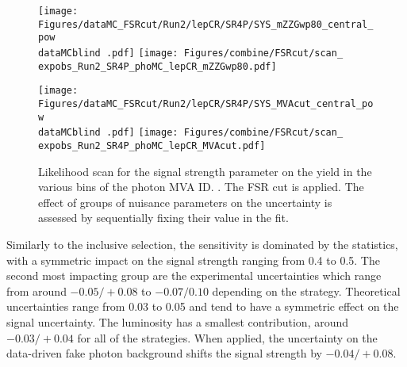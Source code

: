 \begin{figure}
  \texttt{[image: Figures/dataMC\_FSRcut/Run2/lepCR/SR4P/SYS\_mZZGwp80\_central\_pow\\dataMCblind .pdf]}
  \hfill
  \centering
  \texttt{[image: Figures/combine/FSRcut/scan\_\\expobs\_Run2\_SR4P\_phoMC\_lepCR\_mZZGwp80.pdf]}
  \caption{}
  \label{fig:scan_FSRcut_Run2_SR4P_phoMC_lepCR_mZZGwp80}
\end{figure}

\begin{figure}
  \centering
  \texttt{[image: Figures/dataMC\_FSRcut/Run2/lepCR/SR4P/SYS\_MVAcut\_central\_pow\\dataMCblind .pdf]}
  \hfill
  \texttt{[image: Figures/combine/FSRcut/scan\_\\expobs\_Run2\_SR4P\_phoMC\_lepCR\_MVAcut.pdf]}
  \caption{Likelihood scan for the signal strength parameter
    on the yield in the various bins of the photon MVA ID.
    .
    The FSR cut is applied.
    The effect of groups of nuisance parameters on the uncertainty is assessed by sequentially fixing their value in the fit.
  }
  \label{fig:scan_FSRcut_Run2_SR4P_phoMC_lepCR_MVAcut}
\end{figure}

Similarly to the inclusive selection, the sensitivity is dominated by the statistics,
with a symmetric impact on the signal strength ranging from 0.4 to 0.5.
The second most impacting group are the experimental uncertainties
which range from around $-0.05/+0.08$ to $-0.07/0.10$ depending on the strategy.
Theoretical uncertainties range from 0.03 to 0.05 and tend to have a symmetric effect on the signal uncertainty.
The luminosity has a smallest contribution, around $-0.03/+0.04$ for all of the strategies.
When applied, the uncertainty on the data-driven fake photon background shifts the signal strength by $-0.04/+0.08$.

